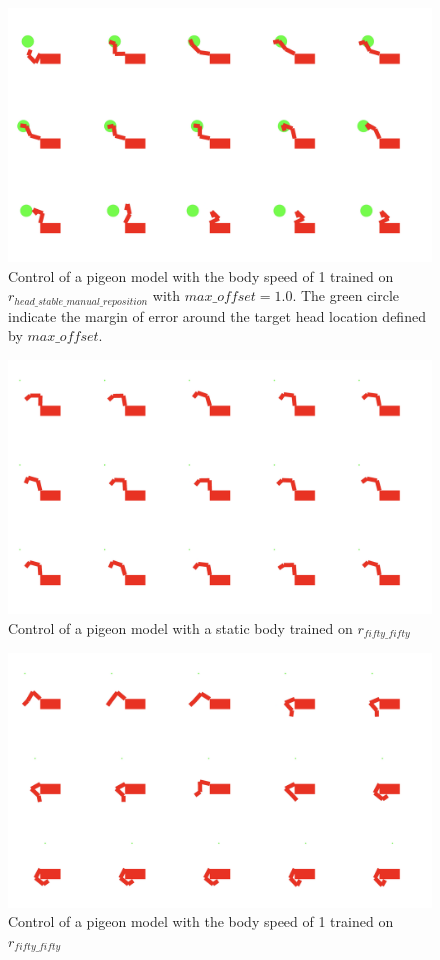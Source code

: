   \begin{figure}[H]
      \centering
      \includegraphics[width=1\textwidth]{figures/frames/frames_003.png}
      \caption{Control of a pigeon model with the body speed of 1 trained on $r_{head\_stable\_manual\_reposition}$ with $max\_offset = 1.0$. The green circle indicate the margin of error around the target head location defined by $max\_offset$.}
      \label{fig:manual_trajectory_not_strict_body_speed_1}
  \end{figure}

  \begin{figure}[H]
      \centering
      \includegraphics[width=1\textwidth]{figures/frames/frames_004.png}
      \caption{Control of a pigeon model with a static body trained on $r_{fifty\_fifty}$}
      \label{fig:fifty_fifty_body_speed_0}
  \end{figure}

  \begin{figure}[H]
      \centering
      \includegraphics[width=1\textwidth]{figures/frames/frames_005.png}
      \caption{Control of a pigeon model with the body speed of 1 trained on $r_{fifty\_fifty}$}
      \label{fig:fifty_fifty_body_speed_1}
  \end{figure}
